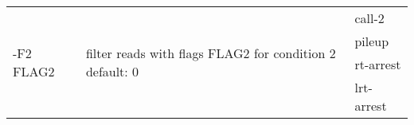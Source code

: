 {\small
\begin{tabular}{@{}p{}p{}l@{}}
\multirow{4}{=}{-F2 FLAG2} & \multirow{4}{=}{filter reads with flags FLAG2 for condition 2
default: 0} & call-2 \\
 &  & pileup \\
 &  & rt-arrest \\
 &  & lrt-arrest \\
\end{tabular}\\
}

